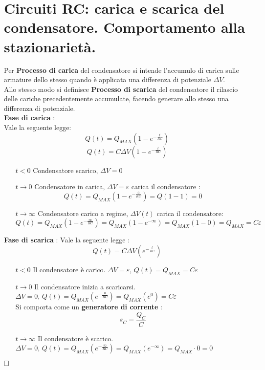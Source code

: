 \section{Circuiti RC: carica e scarica del condensatore.
	Comportamento alla stazionarietà.}
Per \textbf{Processo di carica} del condensatore si intende l'accumulo di carica sulle armature dello stesso quando \`e applicata una differenza di potenziale $\Delta V$.\\
Allo stesso modo si definisce \textbf{Processo di scarica} del condensatore il rilascio delle cariche precedentemente accumulate, facendo generare allo stesso una differenza di potenziale.\\
\textbf{Fase di carica} :\\
Vale la seguente legge:
$$
    Q(t) = Q_{MAX}\left(1 - e^{-\frac{t}{RC}}\right)
$$
$$
    Q(t) = C \Delta V\left(1 - e^{-\frac{t}{RC}}\right)	 
$$
\begin{itemize}
	\item [$t < 0$] { Condensatore scarico, $\Delta V = 0$ }
	\item [$t \rightarrow 0$] { 
		Condensatore in carica, $\Delta V = \varepsilon$ 
		carica il condensatore : \\
	        $$
	           Q(t) = Q_{MAX}\left(1 - e^{-\frac{0}{RC}}\right) = Q\left(1 - 1\right) = 0
	        $$
    }
    \item [$t \rightarrow \infty$] { 
    	Condensatore carico a regime,
    	$\Delta V(t)$ carica il condensatore:
    	$$
    	    Q(t) = Q_{MAX}\left(1 - e^{-\frac{\infty}{RC}}\right) = 
    	    Q_{MAX}\left(1 - e^{-\infty}\right) = 
    	    Q_{MAX}\left(1 - 0\right) = Q_{MAX} = C \varepsilon
    	$$
    }
\end{itemize}
\textbf{ Fase di scarica } :
Vale la seguente legge :
$$
    Q(t) = C \Delta V \left(e^{-\frac{t}{RC}}\right)
$$
\begin{itemize}
	\item [$t < 0$] {
		Il condensatore \`e carico. 
		$\Delta V = \varepsilon$, 
		$Q(t) = Q_{MAX} = C \varepsilon$ 
	}
	\item [$t \rightarrow 0$] {
        Il condensatore inizia a scaricarsi.\\
        $\Delta V = 0$, $Q(t) = Q_{MAX}\left(e^{-\frac{0}{RC}}\right) = 
        Q_{MAX}\left(e^0\right) = C \varepsilon$\\
        Si comporta come un \textbf{generatore di corrente} :
        $$
        \varepsilon_C = \frac{Q_C}{C}
        $$
	}
	\item [$t \rightarrow \infty$] { 
	    Il condensatore \`e scarico.\\
	    $\Delta V = 0$, 
    	$
    	Q(t) = Q_{MAX}\left(e^{-\frac{\infty}{RC}}\right) = 
    	Q_{MAX}\left(e^{-\infty}\right) = Q_{MAX} \cdot 0 = 0
    	$ 
	}
\end{itemize}
$\hfill\square$